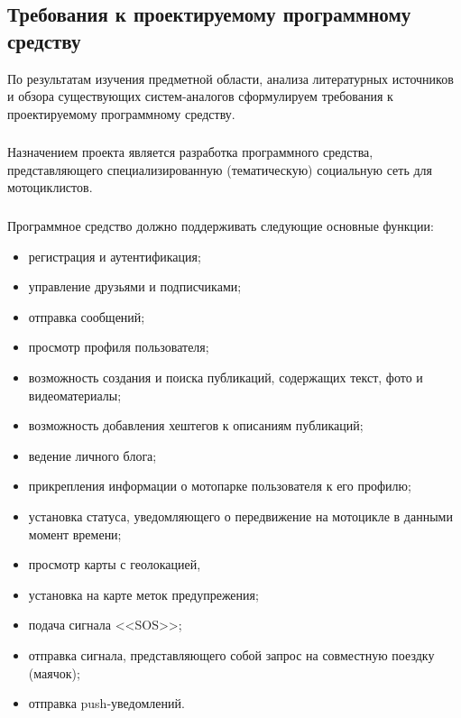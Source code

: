 \subsection{Требования к проектируемому программному средству}
\label{sec:analysis:specification}

По результатам изучения предметной области, анализа литературных источников и обзора существующих систем-аналогов сформулируем требования к проектируемому программному средству.

\subsubsection{}
\label{sec:analysis:specification:purpose}

Назначением проекта является разработка программного средства, представляющего специализированную (тематическую) социальную сеть для мотоциклистов.

\subsubsection{}
\label{sec:analysis:specification:functions}

Программное средство должно поддерживать следующие основные фун\-к\-ции:

\begin{itemize}
	\item регистрация и аутентификация;
	\item управление друзьями и подписчиками;
	\item отправка сообщений;
	\item просмотр профиля пользователя;
	\item возможность создания и поиска публикаций, содержащих текст, фото и видеоматериалы;
	\item возможность добавления хештегов к описаниям публикаций;
	\item ведение личного блога;
	\item прикрепления информации о мотопарке пользователя к его профилю;
	\item установка статуса, уведомляющего о передвижение на мотоцикле в данными момент времени;
	\item просмотр карты с геолокацией,
	\item установка на карте меток предупрежения;
	\item подача сигнала <<SOS>>;
	\item отправка сигнала, представляющего собой запрос на совместную поездку (маячок); 
	\item отправка push-уведомлений.
\end{itemize}

